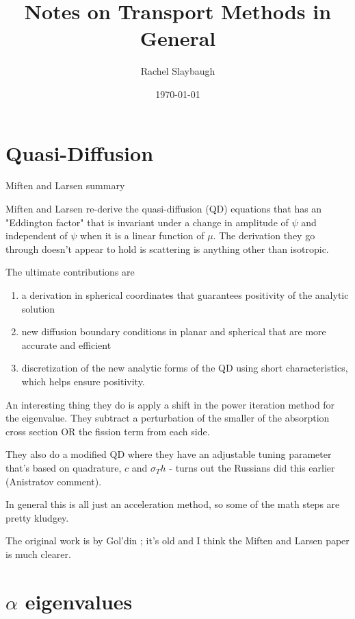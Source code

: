 \documentclass[12pt,twoside]{article}
\date{\today}
\title{Notes on Transport Methods in General}
\author{Rachel Slaybaugh}
\begin{document}
\maketitle

\section*{Quasi-Diffusion}

Miften and Larsen summary \cite{Miften1993}

Miften and Larsen re-derive the quasi-diffusion (QD) equations that has an "Eddington factor" that is invariant under a change in amplitude of $\psi$ and independent of $\psi$ when it is a linear function of $\mu$. The derivation they go through doesn't appear to hold is scattering is anything other than isotropic.

The ultimate contributions are
\begin{enumerate}
\item a derivation in spherical coordinates that guarantees positivity of the analytic solution
\item new diffusion boundary conditions in planar and spherical that are more accurate and efficient
\item discretization of the new analytic forms of the QD using short characteristics, which helps ensure positivity.
\end{enumerate} 

An interesting thing they do is apply a shift in the power iteration method for the eigenvalue. They subtract a perturbation of the smaller of the absorption cross section OR the fission term from each side. 

They also do a modified QD where they have an adjustable tuning parameter that's based on quadrature, $c$ and $\sigma_T h$ - turns out the Russians did this earlier (Anistratov comment). 

In general this is all just an acceleration method, so some of the math steps are pretty kludgey. 


\vspace*{2em}
The original work is by Gol'din \cite{Goldin1964}; it's old and I think the Miften and Larsen paper is much clearer. 

\section*{$\alpha$ eigenvalues}
\end{document}
